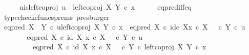 \begin{isabellebody}
\ \ \isamarkupfalse%
\ \isamarkupfalse%
\ u{\isacharunderscore}{\kern0pt}is{\isacharunderscore}{\kern0pt}left{\isacharunderscore}{\kern0pt}coproj{\isacharcolon}{\kern0pt}\ {\isachardoublequoteopen}u\ {\isacharequal}{\kern0pt}\ left{\isacharunderscore}{\kern0pt}coproj\ X\ Y\ {\isasymcirc}\isactrlsub c\ x{\isachardoublequoteclose}\isanewline
\ \ \ \ \isamarkupfalse%
\ eq{\isacharunderscore}{\kern0pt}pred{\isacharunderscore}{\kern0pt}iff{\isacharunderscore}{\kern0pt}eq\ \isamarkupfalse%
\ {\isacharparenleft}{\kern0pt}typecheck{\isacharunderscore}{\kern0pt}cfuncs{\isacharunderscore}{\kern0pt}prems{\isacharcomma}{\kern0pt}\ presburger{\isacharparenright}{\kern0pt}\ \ \isanewline
\ \ \isamarkupfalse%
\ {\isachardoublequoteopen}eq{\isacharunderscore}{\kern0pt}pred\ {\isacharparenleft}{\kern0pt}X\ {\isasymCoprod}\ Y{\isacharparenright}{\kern0pt}\ {\isasymcirc}\isactrlsub c\ {\isasymlangle}u{\isacharcomma}{\kern0pt}left{\isacharunderscore}{\kern0pt}coproj\ X\ Y\ {\isasymcirc}\isactrlsub c\ x{\isasymrangle}\ {\isacharequal}{\kern0pt}\ {\isacharparenleft}{\kern0pt}eq{\isacharunderscore}{\kern0pt}pred\ X\ {\isasymcirc}\isactrlsub c\ {\isasymlangle}id\isactrlsub c\ X{\isacharcomma}{\kern0pt}x\ {\isasymcirc}\isactrlsub c\ {\isasymbeta}\isactrlbsub X\isactrlesub {\isasymrangle}{\isacharparenright}{\kern0pt}\ {\isasymamalg}\ {\isacharparenleft}{\kern0pt}{\isasymf}\ {\isasymcirc}\isactrlsub c\ {\isasymbeta}\isactrlbsub Y\isactrlesub {\isacharparenright}{\kern0pt}\ {\isasymcirc}\isactrlsub c\ u{\isachardoublequoteclose}\isanewline
\ \ \isamarkupfalse%
\ {\isacharminus}{\kern0pt}\isanewline
\ \ \ \ \isamarkupfalse%
\ {\isachardoublequoteopen}{\isacharparenleft}{\kern0pt}{\isacharparenleft}{\kern0pt}eq{\isacharunderscore}{\kern0pt}pred\ X\ {\isasymcirc}\isactrlsub c\ {\isasymlangle}id\ X{\isacharcomma}{\kern0pt}\ x\ {\isasymcirc}\isactrlsub c\ {\isasymbeta}\isactrlbsub X\isactrlesub {\isasymrangle}{\isacharparenright}{\kern0pt}\ {\isasymamalg}\ {\isacharparenleft}{\kern0pt}{\isasymf}\ {\isasymcirc}\isactrlsub c\ {\isasymbeta}\isactrlbsub Y\isactrlesub {\isacharparenright}{\kern0pt}{\isacharparenright}{\kern0pt}\ {\isasymcirc}\isactrlsub c\ u\isanewline
\ \ \ \ \ \ \ \ {\isacharequal}{\kern0pt}\ {\isacharparenleft}{\kern0pt}{\isacharparenleft}{\kern0pt}eq{\isacharunderscore}{\kern0pt}pred\ X\ {\isasymcirc}\isactrlsub c\ {\isasymlangle}id\ X{\isacharcomma}{\kern0pt}\ x\ {\isasymcirc}\isactrlsub c\ {\isasymbeta}\isactrlbsub X\isactrlesub {\isasymrangle}{\isacharparenright}{\kern0pt}\ {\isasymamalg}\ {\isacharparenleft}{\kern0pt}{\isasymf}\ {\isasymcirc}\isactrlsub c\ {\isasymbeta}\isactrlbsub Y\isactrlesub {\isacharparenright}{\kern0pt}{\isacharparenright}{\kern0pt}\ {\isasymcirc}\isactrlsub c\ left{\isacharunderscore}{\kern0pt}coproj\ X\ Y\ {\isasymcirc}\isactrlsub c\ x{\isachardoublequoteclose}\isanewline

\end{isabellebody}
